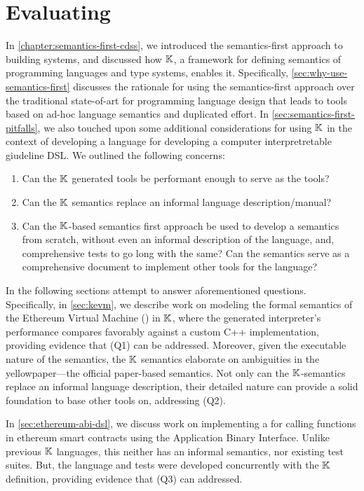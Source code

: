 \chapter{Evaluating \K{}}\label{chapter:evaluating-k}

In \autoref{chapter:semantics-first-cdss}, we introduced the
semantics-first approach to building systems, and discussed how $\mathbb{K}$,
a framework for defining semantics of programming languages and
type systems, enables it. Specifically, \autoref{sec:why-use-semantics-first}
discusses the rationale for using the semantics-first approach over
the traditional state-of-art for programming language design that
leads to tools based on ad-hoc language semantics and duplicated effort.
In \autoref{sec:semantics-first-pitfalls}, we also touched upon
some additional considerations for using $\mathbb{K}$ in the context of
developing a language for developing a computer interpretretable giudeline DSL.
We outlined the following concerns:
\begin{enumerate}[label=(Q\arabic*)]
 \item Can the $\mathbb{K}$ generated tools be performant enough to serve as
 the  tools?
 \item Can the $\mathbb{K}$ semantics replace an informal language description/manual?
 \item Can the $\mathbb{K}$-based semantics first approach be used to develop
 a semantics from scratch, without even an informal description of the language,
  and, comprehensive tests to go long with the same? Can the semantics
  serve as a comprehensive document to implement other tools for the language?
\end{enumerate}
In the following sections attempt to answer aforementioned questions.
Specifically, in \autoref{sec:kevm}, we describe work on modeling the
formal semantics of the Ethereum Virtual Machine (\EVM{}) in $\mathbb{K}$, where
the generated interpreter's performance compares favorably against a
custom C++ implementation, providing evidence that (Q1) can be addressed.
Moreover, given the executable nature of the semantics, the $\mathbb{K}$ semantics
elaborate on ambiguities in the yellowpaper---the official paper-based
\EVM{} semantics. Not only can the $\mathbb{K}$-semantics replace an informal
language description, their detailed nature can provide a solid foundation
to base other tools on, addressing (Q2).

In \autoref{sec:ethereum-abi-dsl}, we discuss work on implementing a
\DSL{} for calling functions in ethereum smart contracts using the
Application Binary Interface. Unlike previous $\mathbb{K}$ languages, this
\DSL{} neither has an informal semantics, nor existing test suites.
But, the language and tests were developed concurrently with the $\mathbb{K}$
definition, providing evidence that (Q3) can addressed.

